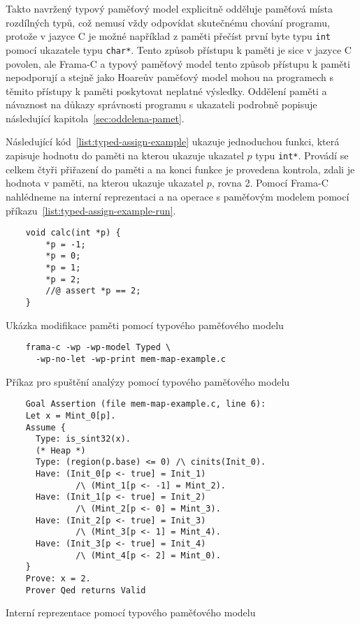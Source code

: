 Takto navržený typový paměťový model explicitně odděluje paměťová místa rozdílných typů,
což nemusí vždy odpovídat skutečnému chování programu,
protože v jazyce C je možné například z paměti přečíst první byte typu \texttt{int}
pomocí ukazatele typu \texttt{char*}.
Tento způsob přístupu k paměti je sice v jazyce C povolen,
ale Frama\mbox{-}C a typový paměťový model tento způsob přístupu k paměti nepodporují
a stejně jako Hoareův paměťový model mohou na programech s těmito přístupy k paměti poskytovat neplatné výsledky.
Oddělení paměti a návaznost na důkazy správnosti programu s ukazateli
podrobně popisuje následující kapitola~\ref{sec:oddelena-pamet}.

Následující kód~\ref{list:typed-assign-example} ukazuje jednoduchou funkci,
která zapisuje hodnotu do paměti na kterou ukazuje ukazatel $p$ typu \texttt{int*}.
Provádí se celkem čtyři přiřazení do paměti a na konci funkce je provedena kontrola,
zdali je hodnota v paměti, na kterou ukazuje ukazatel $p$, rovna 2.
Pomocí Frama\mbox{-}C nahlédneme na interní reprezentaci
a na operace s paměťovým modelem pomocí příkazu~\ref{list:typed-assign-example-run}.

\begin{listing}[H]
    \begin{verbatim}
    void calc(int *p) {
        *p = -1;
        *p = 0;
        *p = 1;
        *p = 2;
        //@ assert *p == 2;
    }
    \end{verbatim}
    \caption{Ukázka modifikace paměti pomocí typového paměťového modelu}
    \label{list:typed-assign-example}
\end{listing}

\begin{listing}[H]
    \begin{verbatim}
    frama-c -wp -wp-model Typed \
      -wp-no-let -wp-print mem-map-example.c
    \end{verbatim}
    \caption{Příkaz pro spuštění analýzy pomocí typového paměťového modelu}
    \label{list:typed-assign-example-run}
\end{listing}

\begin{listing}[H]
    \begin{verbatim}
    Goal Assertion (file mem-map-example.c, line 6):
    Let x = Mint_0[p].
    Assume {
      Type: is_sint32(x).
      (* Heap *)
      Type: (region(p.base) <= 0) /\ cinits(Init_0).
      Have: (Init_0[p <- true] = Init_1)
              /\ (Mint_1[p <- -1] = Mint_2).
      Have: (Init_1[p <- true] = Init_2)
              /\ (Mint_2[p <- 0] = Mint_3).
      Have: (Init_2[p <- true] = Init_3)
              /\ (Mint_3[p <- 1] = Mint_4).
      Have: (Init_3[p <- true] = Init_4)
              /\ (Mint_4[p <- 2] = Mint_0).
    }
    Prove: x = 2.
    Prover Qed returns Valid
    \end{verbatim}
    \caption{Interní reprezentace pomocí typového paměťového modelu}
    \label{list:typed-assign-example-result}
\end{listing}

